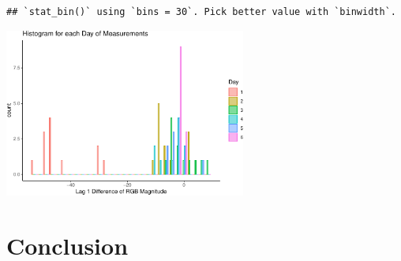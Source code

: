 \documentclass[
  12pt,
]{article}
\begin{document}
\begin{verbatim}
## `stat_bin()` using `bins = 30`. Pick better value with `binwidth`.
\end{verbatim}

\includegraphics[width=300px]{report_files/figure-latex/unnamed-chunk-27-1}

\hypertarget{conclusion}{%
\section{Conclusion}\label{conclusion}}
\end{document}
